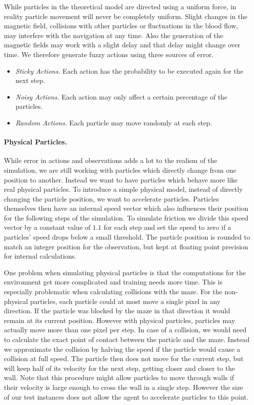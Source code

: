 While particles in the theoretical model are directed using a uniform force, in reality particle movement will never be completely uniform. Slight changes in the magnetic field, collisions with other particles or fluctuations in the blood flow, may interfere with the navigation at any time. Also the generation of the magnetic fields may work with a slight delay and that delay might change over time. We therefore generate fuzzy actions using three sources of error.

\begin{itemize}
    \item \textit{Sticky Actions.} Each action has the probability to be executed again for the next step.
    \item \textit{Noisy Actions.} Each action may only affect a certain percentage of the particles.
    \item \textit{Random Actions.} Each particle may move randomly at each step.
\end{itemize}



\paragraph{Physical Particles.}
While error in actions and observations adds a lot to the realism of the simulation, we are still working with particles which directly change from one position to another. Instead we want to have particles which behave more like real physical particles. To introduce a simple physical model, instead of directly changing the particle position, we want to accelerate particles. Particles themselves then have an internal speed vector which also influences their position for the following steps of the simulation. To simulate friction we divide this speed vector by a constant value of $1.1$ for each step and set the speed to zero if a particles' speed drops below a small threshold. The particle position is rounded to match an integer position for the observation, but kept at floating point precision for internal calculations.

One problem when simulating physical particles is that the computations for the environment get more complicated and training needs more time. This is especially problematic when calculating collisions with the maze. For the non-physical particles, each particle could at most move a single pixel in any direction. If the particle was blocked by the maze in that direction it would remain at its current position. However with physical particles, particles may actually move more than one pixel per step. In case of a collision, we would need to calculate the exact point of contact between the particle and the maze. Instead we approximate the collision by halving the speed if the particle would cause a collision at full speed. The particle then does not move for the current step, but will keep half of its velocity for the next step, getting closer and closer to the wall. Note that this procedure might allow particles to move through walls if their velocity is large enough to cross the wall in a single step. However the size of our test instances does not allow the agent to accelerate particles to this point.


